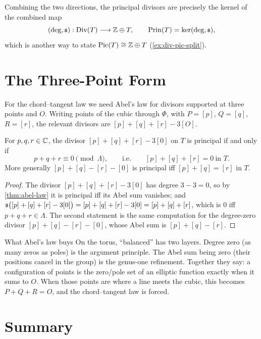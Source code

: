 Combining the two directions, the principal divisors are precisely the kernel of
the combined map
\[
  (\deg, \mathfrak{s}) : \operatorname{Div}(T) \longrightarrow \mathbb{Z} \oplus T,
  \qquad \operatorname{Prin}(T) = \ker(\deg,\mathfrak{s}),
\]
which is another way to state \(\operatorname{Pic}(T) \cong \mathbb{Z} \oplus T\)
(\cref{ex:div-pic-split}).

\section{The Three-Point Form}
\label{sec:abel-three-point}

For the chord--tangent law we need Abel's law for divisors supported at three
points and \(O\). Writing points of the cubic through \(\Phi\), with \(P = [p]\),
\(Q = [q]\), \(R = [r]\), the relevant divisors are \([p] + [q] + [r] - 3[O]\).

\begin{corollary}
\label{cor:abel-three-point}
For \(p, q, r \in \mathbb{C}\), the divisor \([p] + [q] + [r] - 3[0]\) on \(T\) is
principal if and only if
\[
  p + q + r \equiv 0 \pmod\Lambda,
  \qquad\text{i.e.}\qquad [p] + [q] + [r] = 0 \ \text{in } T .
\]
More generally \([p] + [q] - [r] - [0]\) is principal iff
\([p] + [q] = [r]\) in \(T\).
\end{corollary}

\begin{proof}
The divisor \([p]+[q]+[r]-3[0]\) has degree \(3 - 3 = 0\), so by
\cref{thm:abel-law} it is principal iff its Abel sum vanishes; and
\(\mathfrak{s}\bigl([p]+[q]+[r]-3[0]\bigr) = [p]+[q]+[r] - 3[0] = [p]+[q]+[r]\), which is
\(0\) iff \(p+q+r \in \Lambda\). The second statement is the same computation for
the degree-zero divisor \([p]+[q]-[r]-[0]\), whose Abel sum is
\([p]+[q]-[r]\).
\end{proof}

\begin{keyidea}{What Abel's law buys}
On the torus, ``balanced'' has two layers. Degree zero (as many zeros as poles)
is the argument principle. The Abel sum being zero (their positions cancel in the
group) is the genus-one refinement. Together they say: a configuration of points
is the zero/pole set of an elliptic function exactly when it sums to \(O\). When
those points are where a line meets the cubic, this becomes \(P + Q + R = O\), and
the chord--tangent law is forced.
\end{keyidea}

\section{Summary}
\label{sec:abel-summary}

